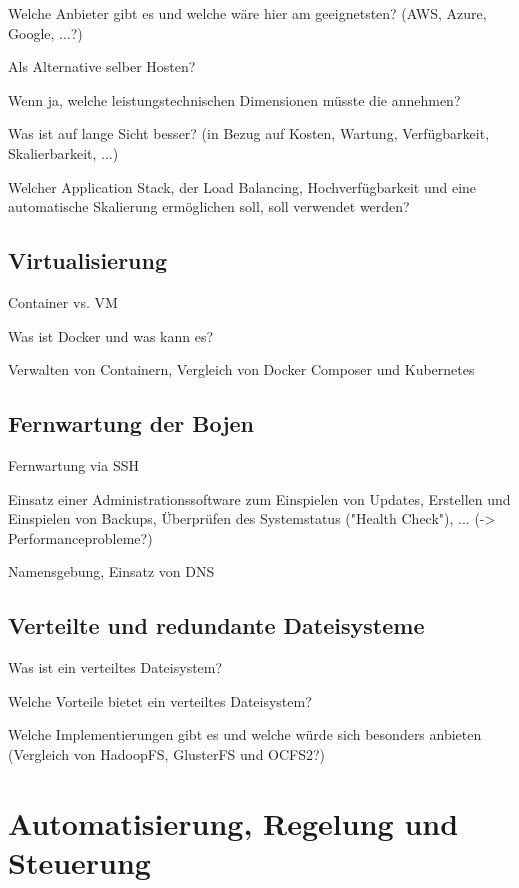 Welche Anbieter gibt es und welche wäre hier am geeignetsten? (AWS, Azure, Google, ...?)


Als Alternative selber Hosten?

Wenn ja, welche leistungstechnischen Dimensionen müsste die annehmen?

Was ist auf lange Sicht besser?
(in Bezug auf Kosten, Wartung, Verfügbarkeit, Skalierbarkeit, ...)

Welcher Application Stack, der Load Balancing, Hochverfügbarkeit und eine automatische Skalierung ermöglichen soll, soll verwendet werden?



\subsection{Virtualisierung}
\label{subsec:Virtualisierung}
Container vs. VM

Was ist Docker und was kann es?

Verwalten von Containern, Vergleich von Docker Composer und Kubernetes


\subsection{Fernwartung der Bojen}
\label{subsec:Fernwartung der Bojen}
Fernwartung via SSH

Einsatz einer Administrationssoftware zum Einspielen von Updates, Erstellen und Einspielen von Backups, Überprüfen des Systemstatus ("Health Check"), ...
(-> Performanceprobleme?)

Namensgebung, Einsatz von DNS

\subsection{Verteilte und redundante Dateisysteme}
\label{subsec:Verteilte und redundante Dateisysteme}
Was ist ein verteiltes Dateisystem?

Welche Vorteile bietet ein verteiltes Dateisystem?

Welche Implementierungen gibt es und welche würde sich besonders anbieten (Vergleich von HadoopFS, GlusterFS und OCFS2?)




\section{Automatisierung, Regelung und Steuerung}
\label{sec:Automatisierung, Regelung und Steuerung}
